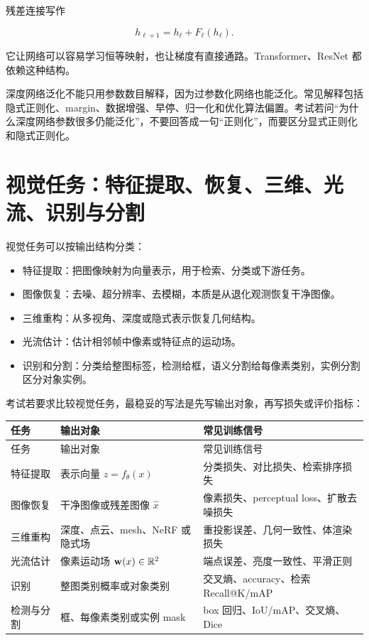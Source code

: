 \documentclass[11pt]{ctexart}
\begin{document}
残差连接写作

\[
  h_{\ell+1}=h_\ell+F_\ell(h_\ell).
\]

它让网络可以容易学习恒等映射，也让梯度有直接通路。Transformer、ResNet 都依赖这种结构。

深度网络泛化不能只用参数数目解释，因为过参数化网络也能泛化。常见解释包括隐式正则化、margin、数据增强、早停、归一化和优化算法偏置。考试若问“为什么深度网络参数很多仍能泛化”，不要回答成一句“正则化”，而要区分显式正则化和隐式正则化。

\section{视觉任务：特征提取、恢复、三维、光流、识别与分割}


视觉任务可以按输出结构分类：

\begin{itemize}
  \item 特征提取：把图像映射为向量表示，用于检索、分类或下游任务。
  \item 图像恢复：去噪、超分辨率、去模糊，本质是从退化观测恢复干净图像。
  \item 三维重构：从多视角、深度或隐式表示恢复几何结构。
  \item 光流估计：估计相邻帧中像素或特征点的运动场。
  \item 识别和分割：分类给整图标签，检测给框，语义分割给每像素类别，实例分割区分对象实例。
\end{itemize}

考试若要求比较视觉任务，最稳妥的写法是先写输出对象，再写损失或评价指标：

\begingroup
\small
\begin{longtable}{L{0.22\textwidth}L{0.35\textwidth}L{0.32\textwidth}}
\toprule
任务 & 输出对象 & 常见训练信号 \\
\midrule
\endfirsthead
\toprule
任务 & 输出对象 & 常见训练信号 \\
\midrule
\endhead
特征提取 & 表示向量 \(z=f_\theta(x)\) & 分类损失、对比损失、检索排序损失 \\
图像恢复 & 干净图像或残差图像 \(\hat x\) & 像素损失、perceptual loss、扩散去噪损失 \\
三维重构 & 深度、点云、mesh、NeRF 或隐式场 & 重投影误差、几何一致性、体渲染损失 \\
光流估计 & 像素运动场 \(\mathbf w(x)\in\mathbb{R}^2\) & 端点误差、亮度一致性、平滑正则 \\
识别 & 整图类别概率或对象类别 & 交叉熵、accuracy、检索 Recall@K/mAP \\
检测与分割 & 框、每像素类别或实例 mask & box 回归、IoU/mAP、交叉熵、Dice \\
\bottomrule
\end{longtable}
\endgroup
\end{document}
